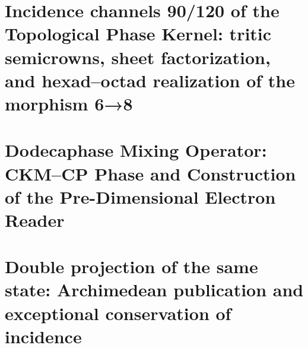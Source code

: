 \chapter{Incidence channels 90/120 of the Topological Phase Kernel: tritic semicrowns, sheet factorization, and hexad--octad realization of the morphism 6→8}
\label{chap:sucesor-102-15}
\begin{HMTScientificOwnerSubordinated}

\end{HMTScientificOwnerSubordinated}



















\chapter{Dodecaphase Mixing Operator: CKM–CP Phase and Construction of the Pre-Dimensional Electron Reader}
\label{chap:sucesor-102-16}
















\chapter{Double projection of the same state: Archimedean publication and exceptional conservation of incidence}
\label{chap:sucesor-102-17}
\label{chap:doble}



